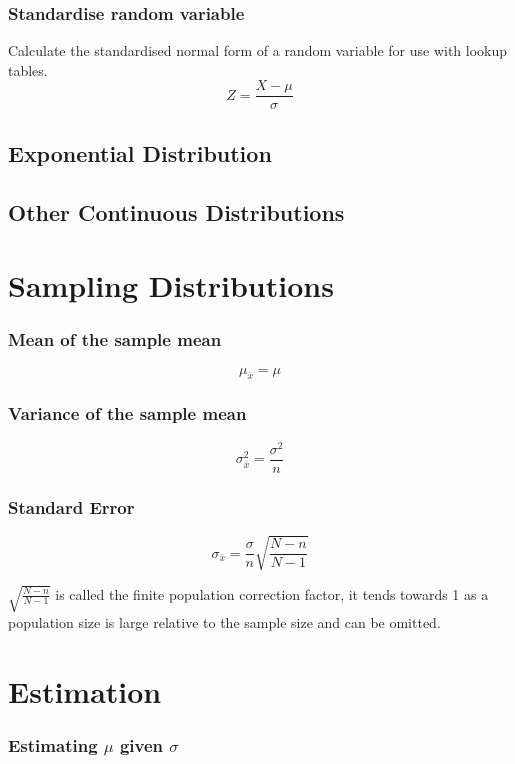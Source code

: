 \documentclass{article}
\begin{document}
\subsubsection{Standardise random variable}
Calculate the standardised normal form of a random variable for use with lookup tables.
$$
Z = \frac{X - \mu}{\sigma}
$$

\subsection{Exponential Distribution}

\subsection{Other Continuous Distributions}




\section{Sampling Distributions}

\subsubsection{Mean of the sample mean}

$$
\mu_{\bar{x}}=\mu
$$

\subsubsection{Variance of the sample mean}

$$
\sigma^2_{\bar{x}} = \frac{\sigma^2}{n}
$$

\subsubsection{Standard Error}

$$
\sigma_{\bar{x}} = \frac{\sigma}{n} \sqrt{\frac{N - n}{N - 1}}
$$

$ \sqrt{\frac{N - n}{N - 1}} $ is called the finite population correction factor, it tends towards 1 as a population size is large relative to the sample size and can be omitted.




\section{Estimation}

\subsubsection{Estimating $\mu$ given $\sigma$}
\end{document}
